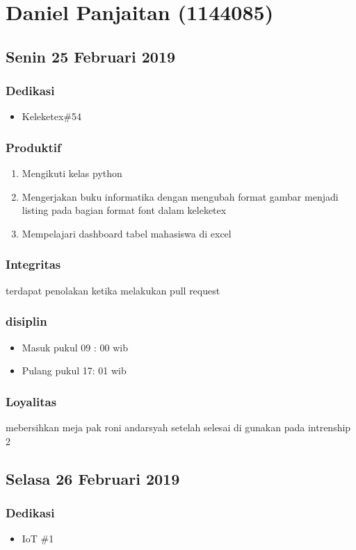 \chapter{Daniel Panjaitan (1144085)}


\section{Senin 25 Februari 2019}
\subsection{Dedikasi}
\begin{itemize}
  \item Keleketex\#54 
  \end{itemize}
\subsection{Produktif}
\begin{enumerate}
  \item Mengikuti kelas python
  \item Mengerjakan buku informatika dengan mengubah format gambar menjadi listing pada bagian format font dalam keleketex
  \item Mempelajari dashboard tabel mahasiswa di excel
\end{enumerate}
\subsection{Integritas}
terdapat penolakan ketika melakukan pull request
\subsection{disiplin}
\begin{itemize}
  \item Masuk pukul 09 : 00 wib
  \item Pulang pukul 17: 01 wib
\end{itemize}
\subsection{Loyalitas}
mebersihkan meja pak roni andarsyah setelah selesai di gunakan pada intrenship 2

\section{Selasa 26 Februari 2019}
\subsection{Dedikasi}
\begin{itemize}
    \item IoT \#1
    \end{itemize}
